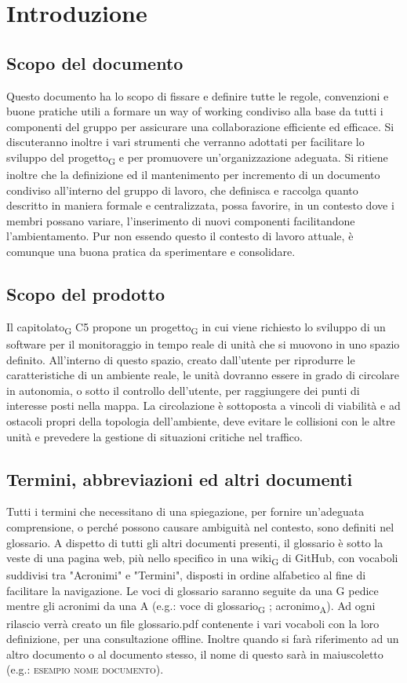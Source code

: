 \section{Introduzione}
\subsection{Scopo del documento}
    Questo documento ha lo scopo di fissare e definire tutte le regole, convenzioni e buone pratiche utili a formare un way of working condiviso alla base da tutti i componenti del gruppo per assicurare una collaborazione efficiente ed efficace. Si discuteranno inoltre i vari strumenti che verranno adottati per facilitare lo sviluppo del progetto\textsubscript{G} e per promuovere un'organizzazione adeguata.
    Si ritiene inoltre che la definizione ed il mantenimento per incremento di un documento condiviso all'interno del gruppo di lavoro, che definisca e raccolga quanto descritto in maniera formale e centralizzata, possa favorire, in un contesto dove i membri possano variare, l'inserimento di nuovi componenti facilitandone l'ambientamento. Pur non essendo questo il contesto di lavoro attuale, è comunque una buona pratica da sperimentare e consolidare.

\subsection{Scopo del prodotto}
Il capitolato\textsubscript{G} C5 propone un progetto\textsubscript{G} in cui viene richiesto lo sviluppo di un software per il monitoraggio in tempo reale di unità che si muovono in uno spazio definito. All'interno di questo spazio, creato dall'utente per riprodurre le caratteristiche di un ambiente reale, le unità dovranno essere in grado di circolare in autonomia, o sotto il controllo dell'utente, per raggiungere dei punti di interesse posti nella mappa.  La circolazione è sottoposta a vincoli di viabilità e ad ostacoli propri della topologia dell'ambiente, deve evitare le collisioni con le altre unità e prevedere la gestione di situazioni critiche nel traffico.

\subsection{Termini, abbreviazioni ed altri documenti}
    Tutti i termini che necessitano di una spiegazione, per fornire un'adeguata comprensione, o perché possono causare ambiguità nel contesto, sono definiti nel glossario. A dispetto di tutti gli altri documenti presenti, il glossario è sotto la veste di una pagina web, più nello specifico in una wiki\textsubscript{G} di GitHub, con vocaboli suddivisi tra "Acronimi" e "Termini", disposti in ordine alfabetico al fine di facilitare la navigazione. Le voci di glossario saranno seguite da una G pedice mentre gli acronimi da una A (e.g.: voce di glossario\textsubscript{G} ; acronimo\textsubscript{A}).
    Ad ogni rilascio verrà creato un file glossario.pdf contenente i vari vocaboli con la loro definizione, per una consultazione offline.
    Inoltre quando si farà riferimento ad un altro documento o al documento stesso, il nome di questo sarà in maiuscoletto (e.g.: \textsc{esempio nome documento}).

